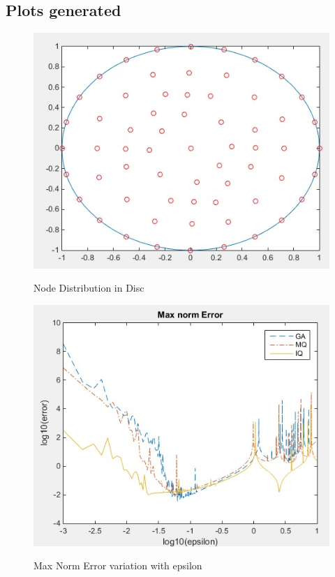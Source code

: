 \documentclass[11pt]{article}
\begin{document}
\subsection{Plots generated}


\begin{figure}[h!]
\centering
\includegraphics[scale=0.7]{nodeDist.jpg}\\
\caption{Node Distribution in Disc}
\label{fig:NodeDistribution}
\end{figure}


\begin{figure}[h!]
\centering
\includegraphics[scale=0.7]{pdeTimeInvariant.jpg}\\
\caption{Max Norm Error variation with epsilon}
\label{fig:errorPDEspatial}
\end{figure}
\end{document}
